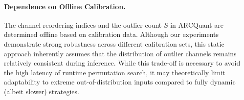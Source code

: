\documentclass[11pt]{article}
\begin{document}
\paragraph{Dependence on Offline Calibration.}
The channel reordering indices and the outlier count $S$ in ARCQuant are determined offline based on calibration data. Although our experiments demonstrate strong robustness across different calibration sets, this static approach inherently assumes that the distribution of outlier channels remains relatively consistent during inference. While this trade-off is necessary to avoid the high latency of runtime permutation search, it may theoretically limit adaptability to extreme out-of-distribution inputs compared to fully dynamic (albeit slower) strategies.




%

\end{document}
